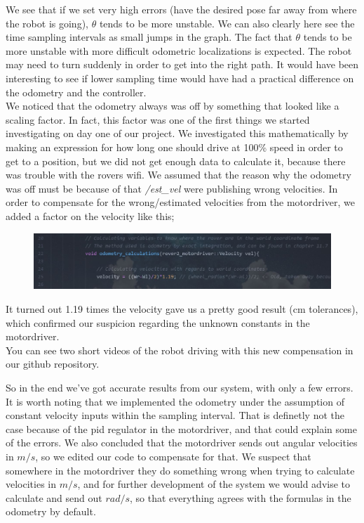 \documentclass[a4paper,10pt]{article}
\begin{document}
		We see that if we set very high errors (have the desired pose far away from where the robot is going), $\theta$ tends to be more unstable. We can also clearly here see the time sampling
		intervals as small jumps in the graph. The fact that $\theta$ tends to be more unstable with more difficult odometric localizations is expected. The robot may need to turn suddenly in order
		to get into the right path. It would have been interesting to see if lower sampling time would have had a practical difference on the odometry and the controller.\\
		We noticed that the odometry always was off by something that looked like a scaling factor. In fact, this factor was one of the first things we started investigating on day one of our project.
		We investigated this mathematically by making an expression for how long one should drive at 100\% speed in order to get to a position, but we did not get enough data to calculate it, because
		there was trouble with the rovers wifi. We assumed that the reason why the odometry was off must be because of that \textit{/est\_vel} were publishing wrong velocities. In order to
		compensate for the wrong/estimated velocities from the motordriver, we added a factor on the velocity like this;

		\begin{figure}[H]
		\centering
		\includegraphics[width=1\textwidth]{snippet_adjustment_factor.JPG}
		\end{figure}
		It turned out 1.19 times the velocity gave us a pretty good result (cm tolerances), which confirmed our suspicion regarding the unknown constants in the motordriver.\\
		You can see two short videos of the robot driving with this new compensation in our github repository.


		So in the end we've got accurate results from our system, with only a few errors. It is worth noting that we implemented the odometry under the assumption of constant velocity inputs within the sampling
		interval. That is definetly not the case because of the pid regulator in the motordriver, and that could explain some of the errors. We also concluded that the motordriver sends
		out angular velocities in $m/s$, so we edited our code to compensate for that. We suspect that somewhere in the motordriver they do something wrong when trying to calculate velocities in
		$m/s$, and for further development of the system we would advise to calculate and send out $rad/s$, so that everything agrees with the formulas in the odometry by default.
\end{document}

